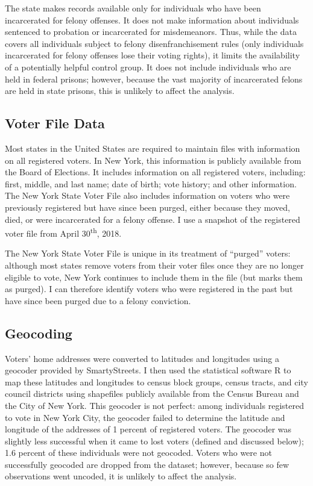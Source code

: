 \documentclass[12pt,]{article}
\begin{document}
The state makes records available only for individuals who have been incarcerated for felony offenses. It does not make information about individuals sentenced to probation or incarcerated for misdemeanors. Thus, while the data covers all individuals subject to felony disenfranchisement rules (only individuals incarcerated for felony offenses lose their voting rights), it limits the availability of a potentially helpful control group. It does not include individuals who are held in federal prisons; however, because the vast majority of incarcerated felons are held in state prisons, this is unlikely to affect the analysis.

\hypertarget{voter-file-data}{%
\subsection*{Voter File Data}\label{voter-file-data}}

Most states in the United States are required to maintain files with information on all registered voters. In New York, this information is publicly available from the Board of Elections. It includes information on all registered voters, including: first, middle, and last name; date of birth; vote history; and other information. The New York State Voter File also includes information on voters who were previously registered but have since been purged, either because they moved, died, or were incarcerated for a felony offense. I use a snapshot of the registered voter file from April 30\textsuperscript{th}, 2018.

The New York State Voter File is unique in its treatment of ``purged'' voters: although most states remove voters from their voter files once they are no longer eligible to vote, New York continues to include them in the file (but marks them as purged). I can therefore identify voters who were registered in the past but have since been purged due to a felony conviction.

\hypertarget{geocoding}{%
\subsection*{Geocoding}\label{geocoding}}

Voters' home addresses were converted to latitudes and longitudes using a geocoder provided by SmartyStreets. I then used the statistical software R to map these latitudes and longitudes to census block groups, census tracts, and city council districts using shapefiles publicly available from the Census Bureau and the City of New York. This geocoder is not perfect: among individuals registered to vote in New York City, the geocoder failed to determine the latitude and longitude of the addresses of 1 percent of registered voters. The geocoder was slightly less successful when it came to lost voters (defined and discussed below); 1.6 percent of these individuals were not geocoded. Voters who were not successfully geocoded are dropped from the dataset; however, because so few observations went uncoded, it is unlikely to affect the analysis.
\end{document}
